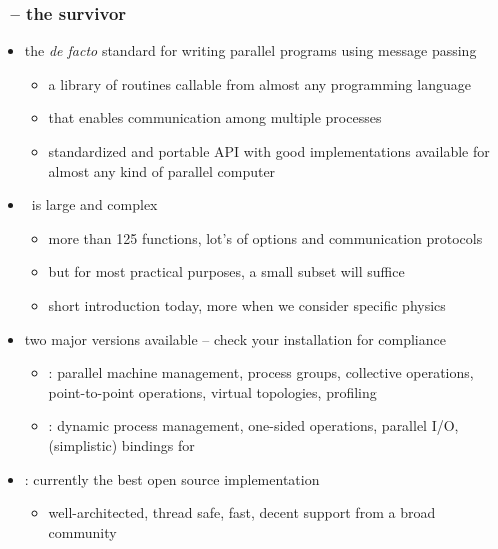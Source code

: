 \begin{frame}[fragile]
%
  \frametitle{\mpi\ -- the survivor}
%
  \begin{itemize}
%
  \item the {\em de facto} standard for writing parallel programs using message passing
    \begin{itemize}
    \item a library of routines callable from almost any programming language
    \item that enables communication among multiple processes
    \item standardized and portable API with good implementations available for almost any kind
      of parallel computer
    \end{itemize}
%
  \item \mpi\ is large and complex
    \begin{itemize}
    \item more than 125 functions, lot's of options and communication protocols
    \item but for most practical purposes, a small subset will suffice
    \item short introduction today, more when we consider specific physics
    \end{itemize}
%
  \item two major versions available -- check your installation for compliance
    \begin{itemize}
    \item {}: parallel machine management, process groups, collective operations,
      point-to-point operations, virtual topologies, profiling
    \item {}: dynamic process management, one-sided operations, parallel I/O, (simplistic)
      bindings for \cpp
    \end{itemize}
%
  \item {}: currently the best open source implementation
    \begin{itemize}
    \item well-architected, thread safe, fast, decent support from a broad community
    \end{itemize}
  \end{itemize}
%
\end{frame}

